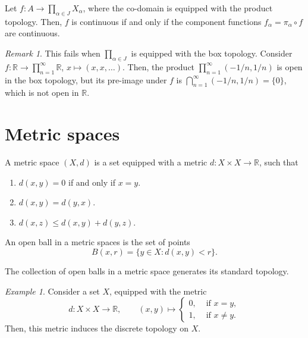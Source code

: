 \documentclass[11pt]{article}
\newcommand{\R}{\mathbb{R}}
\theoremstyle{definition}
\theoremstyle{remark}
\newtheorem*{remark}{Remark}
\newtheorem*{example}{Example}
\numberwithin{equation}{section}
\begin{document}
    \begin{lemma}
        Let $f\colon A \to \prod_{\alpha \in J} X_\alpha$, where the co-domain is
        equipped with the product topology. Then, $f$ is continuous if and only if
        the component functions $f_\alpha = \pi_\alpha\circ f$ are continuous.

        \begin{remark}
            This fails when $\prod_{\alpha \in J}$ is equipped with the box topology.
            Consider $f\colon \R \to \prod_{n = 1}^\infty \R$, $x \mapsto (x, x,
            \dots)$. Then, the product $\prod_{n = 1}^\infty (- 1 / n, 1 / n)$ is
            open in the box topology, but its pre-image under $f$ is $\bigcap_{n =
            1}^\infty (-1 / n, 1 / n) = \{0\}$, which is not open in $\R$.
        \end{remark}
    \end{lemma}
    

    \section{Metric spaces}
    
    \begin{definition}
        A metric space $(X, d)$ is a set equipped with a metric $d\colon X \times X
        \to \R$, such that \begin{enumerate}
            \itemsep0em
            \item $d(x, y) = 0$ if and only if $x = y$.
            \item $d(x, y) = d(y, x)$.
            \item $d(x, z) \leq d(x, y) + d(y, z)$.
        \end{enumerate}
    \end{definition}

    \begin{definition}
        An open ball in a metric spaces is the set of points \[
            B(x, r) = \{y \in X : d(x, y) < r\}.
        \] 
    \end{definition}

    \begin{lemma}
        The collection of open balls in a metric space generates its standard
        topology.
    \end{lemma}

    \begin{example}
        Consider a set $X$, equipped with the metric \[
            d\colon X \times X \to \R, \qquad (x, y) \mapsto \begin{cases}
                0, &\text{ if } x = y, \\
                1, &\text{ if } x \neq y.
            \end{cases}
        \] Then, this metric induces the discrete topology on $X$.
    \end{example}
\end{document}
